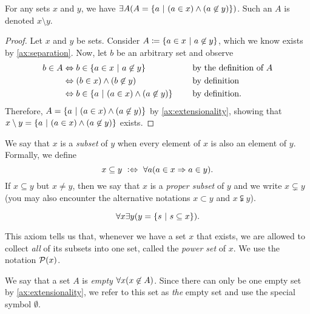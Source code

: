 \begin{theorem}
    For any sets \(x\) and \(y\),
    we have \(\exists A \pn*{A = \set*{a \suchthat (a \in x) \meet (a \not \in y)}}\).
    Such an \(A\) is denoted \(x \setminus y\).
\end{theorem}
\begin{proof}
    Let \(x\) and \(y\) be sets.
    Consider \(A \defn \set*{a \in x \suchthat a \not \in y}\),
    which we know exists by \autoref{ax:separation}.
    Now, let \(b\) be an arbitrary set and observe
    \begin{alignat*}{2}
        b \in A &\iff b \in \set*{a \in x \suchthat a \not \in y} &&\text{by the definition of \(A\)} \\
                &\iff \pn*{b \in x} \meet \pn*{b \not \in y} &&\text{by definition} \\
                &\iff b \in \set*{a \suchthat \pn*{a \in x} \meet \pn*{a \not \in y}}~~~~&&\text{by definition}.
    \end{alignat*}
    Therefore, \(A = \set*{a \suchthat \pn*{a \in x} \meet \pn*{a \not \in y}}\) by \autoref{ax:extensionality},
    showing that \(x \setminus y = \set*{a \suchthat \pn*{a \in x} \meet \pn*{a \not \in y}}\) exists.
\end{proof}

\begin{definition}[Subsets]
    We say that \(x\) is a \emph{subset} of \(y\) when every element of \(x\) is also an element of \(y\).
    Formally, we define
    \[
        x \subseteq y \iffdefn \forall a \pn*{a \in x \implies a \in y}.
    \]
    If \(x \subseteq y\) but \(x \neq y\),
    then we say that \(x\) is a \emph{proper subset} of \(y\) and we write \(x \subsetneq y\)
    (you may also encounter the alternative notations \(x \subset y\) and \(x \subsetneqq y\)).
\end{definition}

\begin{axiom}
    \vspace{-\abovedisplayskip}
    \[
        \forall x \exists y \pn*{y = \set*{s \suchthat s \subseteq x}}.
    \]

    This axiom tells us that, whenever we have a set \(x\) that exists,
    we are allowed to collect \emph{all} of its subsets into one set, called the \emph{power set} of \(x\).
    We use the notation \(\power{x}\).
\end{axiom}

\begin{definition}
    We say that a set \(A\) is \emph{empty} \iffbydefn \(\forall x \pn*{x \not \in A}\).
    Since there can only be one empty set by \autoref{ax:extensionality},
    we refer to this set as \emph{the} empty set and use the special symbol \(\emptyset\).
\end{definition}

